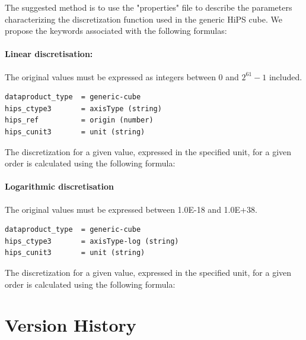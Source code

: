 \documentclass[11pt,a4paper]{ivoa}
\begin{document}
The suggested method is to use the "properties" file to describe the parameters characterizing the discretization function used in the generic HiPS cube. We propose the keywords associated with the following formulas:

\paragraph{Linear discretisation:}

The original values must be expressed as integers between 0 and $2^{61}-1$ included.

\begin{tcolorbox}
\begin{verbatim}
dataproduct_type  = generic-cube
hips_ctype3       = axisType (string)
hips_ref          = origin (number)
hips_cunit3       = unit (string)
\end{verbatim}
\end{tcolorbox}

The discretization for a given value, expressed in the specified unit, for a given order is calculated using the following formula:

\medskip
\noindent{}
\medskip

\paragraph{Logarithmic discretisation}

The original values must be expressed between 1.0E-18 and 1.0E+38.

\begin{tcolorbox}
\begin{verbatim}
dataproduct_type  = generic-cube
hips_ctype3       = axisType-log (string)
hips_cunit3       = unit (string)
 \end{verbatim}
\end{tcolorbox}

The discretization for a given value, expressed in the specified unit, for a given order is calculated using the following formula:

\medskip
\noindent{}
\medskip


\section{Version History}
\label{sec:history}
\end{document}
